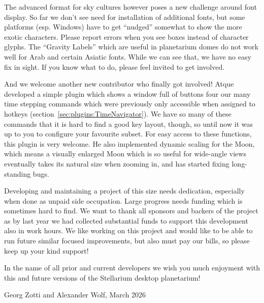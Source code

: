 The advanced format for sky cultures however poses a new challenge around font display. So far we don't see need for installation of additional fonts, 
but some platforms (esp. Windows) have to get ``nudged'' somewhat to show the more exotic characters. 
Please report errors when you see boxes instead of character glyphs.
The ``Gravity Labels'' which are useful in planetarium domes do not work well for Arab and certain Asiatic fonts. 
While we can see that, we have no easy fix in sight. If you know what to do, please feel invited to get involved. 

And we welcome another new contributor who finally got involved! Atque developed a simple plugin which shows a window full of buttons four our many time stepping commands 
which were previously only accessible when assigned to hotkeys (section~\ref{sec:plugins:TimeNavigator}). 
We have so many of these commands that it is hard to find a good key layout, though, so until now it was up to you to configure your favourite subset. 
For easy access to these functions, this plugin is very welcome. 
He also implemented dynamic scaling for the Moon, which means a visually enlarged Moon which is so useful for wide-angle views eventually takes its natural size when zooming in, 
and has started fixing long-standing bugs. 


Developing and maintaining a project of this size needs dedication, especially when done as unpaid side occupation. 
Large progress needs funding which is sometimes hard to find. 
We want to thank all sponsors and backers of the project as by last year we had collected substantial funds to support this development also in work hours. 
We like working on this project and would like to be able to run future similar focused improvements, but also must pay our bills, so please keep up your kind support! 




In the name of all prior and current developers we wish you much enjoyment with
this and future versions of the Stellarium desktop planetarium!

\begin{flushright}
Georg Zotti and Alexander Wolf, March 2026
\end{flushright}



